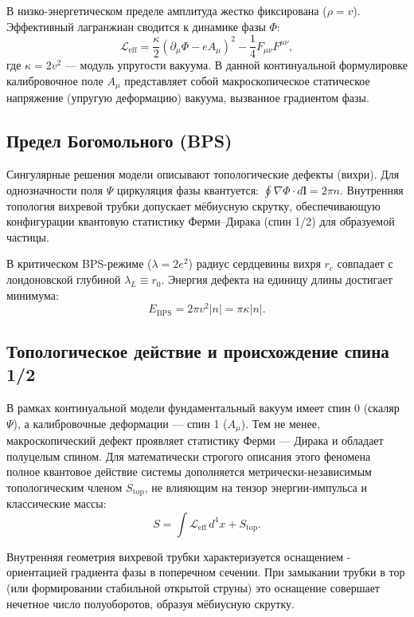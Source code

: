 \documentclass[12pt,a4paper]{article}
\begin{document}
	В низко-энергетическом пределе амплитуда жестко фиксирована ($\rho = v$). Эффективный лагранжиан сводится к динамике фазы $\Phi$:
	\begin{equation}
		\mathcal{L}_{\text{eff}} = \frac{\kappa}{2} (\partial_\mu \Phi - e A_\mu)^2 - \frac{1}{4} F_{\mu\nu} F^{\mu\nu},
		\label{eq:lagrangian_eff}
	\end{equation}
	где $\kappa = 2v^2$ — модуль упругости вакуума. 
	В данной континуальной формулировке калибровочное поле $A_\mu$ представляет собой макроскопическое статическое напряжение (упругую деформацию) вакуума, вызванное градиентом фазы.
	
	\subsection{Предел Богомольного (BPS)}
	Сингулярные решения модели описывают топологические дефекты (вихри). Для однозначности поля $\Psi$ циркуляция фазы квантуется: $\oint \nabla \Phi \cdot d\mathbf{l} = 2\pi n$. Внутренняя топология вихревой трубки допускает мёбиусную скрутку, обеспечивающую конфигурации квантовую статистику Ферми--Дирака (спин 1/2) для образуемой частицы.
	
	В критическом BPS-режиме ($\lambda = 2e^2$) радиус сердцевины вихря $r_c$ совпадает с лондоновской глубиной $\lambda_L \equiv r_0$. Энергия дефекта на единицу длины достигает минимума:
	\begin{equation}
		E_{\text{BPS}} = 2\pi v^2 |n| = \pi \kappa |n|.
		\label{eq:energy_bps}
	\end{equation}

	\subsection{Топологическое действие и происхождение спина 1/2}
	В рамках континуальной модели фундаментальный вакуум имеет спин 0 (скаляр $\Psi$), а калибровочные деформации — спин 1 ($A_\mu$). Тем не менее, макроскопический дефект проявляет статистику Ферми — Дирака и обладает полуцелым спином. Для математически строгого описания этого феномена полное квантовое действие системы дополняется метрически-независимым топологическим членом $S_{\text{top}}$, не влияющим на тензор энергии-импульса и классические массы:
	\begin{equation}
		S = \int \mathcal{L}_{\text{eff}} \, d^4x + S_{\text{top}}.
	\end{equation}
	
	Внутренняя геометрия вихревой трубки характеризуется оснащением - ориентацией градиента фазы в поперечном сечении. При замыкании трубки в тор (или формировании стабильной открытой струны) это оснащение совершает нечетное число полуоборотов, образуя мёбиусную скрутку. 
	
\end{document}
